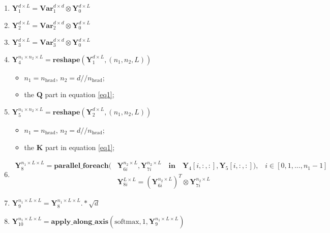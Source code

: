 \begin{enumerate}
  \item $\mathbf{Y}_1^{d \times L}=\mathbf{Var}_{1}^{d \times d} \otimes \mathbf{Y}_0^{d \times L}$

  \item $\mathbf{Y}_2^{d \times L}=\mathbf{Var}_{2}^{d \times d} \otimes \mathbf{Y}_0^{d \times L}$

  \item $\mathbf{Y}_3^{d \times L}=\mathbf{Var}_{3}^{d \times d} \otimes \mathbf{Y}_0^{d \times L}$

  \item $\mathbf{Y}_4^{n_1 \times n_2 \times L} = \textbf{reshape}(\mathbf{Y}_1^{d \times L}, (n_1, n_2, L))$
  \begin{itemize}
    \item $n_1 = n_{\text{head}}$, $n_2 = d // n_{\text{head}}$;
    \item the $\mathbf{Q}$ part in equation \eqref{eq1};
  \end{itemize}

  \item $\mathbf{Y}_5^{n_1 \times n_2 \times L} = \textbf{reshape}(\mathbf{Y}_2^{d \times L}, (n_1, n_2, L))$
  \begin{itemize}
    \item $n_1 = n_{\text{head}}$, $n_2 = d // n_{\text{head}}$;
    \item the $\mathbf{K}$ part in equation \eqref{eq1};
  \end{itemize}

  \item \begin{equation*}
    \begin{aligned}
    \mathbf{Y}_8^{n_1 \times L \times L} = \textbf{parallel\_foreach}(&\mathbf{Y}_{6i}^{n_2 \times L}, \mathbf{Y}_{7i}^{n_2 \times L} \quad \textbf{in} \quad \mathbf{Y}_4[i,:,:], \mathbf{Y}_5[i,:,:]) \text{,} \quad i \in [0,1,...,n_1 - 1] \\
    & \mathbf{Y}_{8i}^{L \times L} = (\mathbf{Y}_{6i}^{n_2 \times L})^{T} \otimes \mathbf{Y}_{7i}^{n_2 \times L}
    \end{aligned}
  \end{equation*}

  \item $\mathbf{Y}_9^{n_1 \times L \times L} = \mathbf{Y}_8^{n_1 \times L \times L} .* \sqrt{d}$
  \item $\mathbf{Y}_{10}^{n_1 \times L \times L} = \textbf{apply\_along\_axis}(\text{softmax}, 1, \mathbf{Y}_9^{n_1 \times L \times L})$


\end{enumerate}
